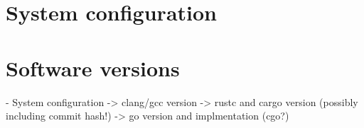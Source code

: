 \chapter{System configuration}
\label{ap:Configuration}





\chapter{Software versions}
\label{ap:Versions}









- System configuration
	-> clang/gcc version
	-> rustc and cargo version (possibly including commit hash!)
	-> go version and implmentation (cgo?)
